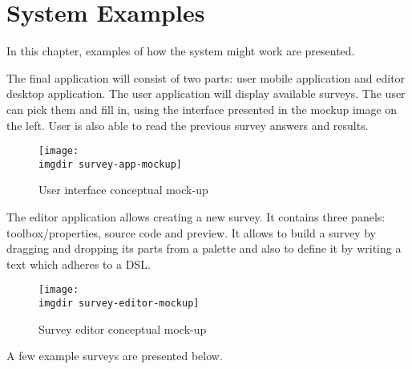 \chapter{System Examples}
\label{chap:examples}
In this chapter, examples of how the system might work are presented.

The final application will consist of two parts: user mobile application and editor desktop application.
The user application will display available surveys. The user can pick them and fill in, using the interface presented in the mockup image on the left. User is also able to read the previous survey answers and results. 
\begin{figure}
  \centering
  \texttt{[image: \\imgdir survey-app-mockup]}
  \label{fig:survey-app-mockup}
  \caption{User interface conceptual mock-up}
\end{figure}

The editor application allows creating a new survey. It contains three panels: toolbox/properties, source code and preview. It allows to build a survey by dragging and dropping its parts from a palette and also to define it by writing a text which adheres to a DSL.

\begin{figure}
  \centering
  \texttt{[image: \\imgdir survey-editor-mockup]}
  \label{fig:survey-editor-mockup}
  \caption{Survey editor conceptual mock-up}
\end{figure}

A few example surveys are presented below.
